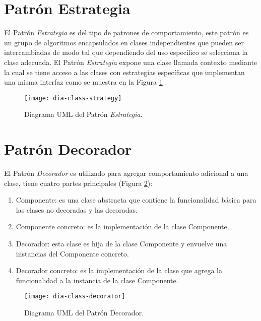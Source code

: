 \section{Patrón Estrategia}\label{sec:strategy}
El Patrón \textit{Estrategia} es del tipo de patrones de comportamiento, este patrón es un grupo de algoritmos encapsulados en clases independientes que pueden ser intercambiadas de modo tal que dependiendo del uso específico se selecciona la clase adecuada. El Patrón \textit{Estrategia} expone una clase llamada contexto mediante la cual se tiene acceso a las clases con estrategias específicas que implementan una misma interfaz como se muestra en la Figura \ref{fig:dia-class-strategy} \cite{DesignPatternsLasater, DesignPatterns}.

\begin{figure}[h]
  \centering
  \texttt{[image: dia-class-strategy]}
  \caption{Diagrama UML del Patrón \textit{Estrategia}\cite{DesignPatternsLasater}.}
  \label{fig:dia-class-strategy}
\end{figure}

\section{Patrón Decorador}\label{sec:decorator}
El Patrón \textit{Decorador} es utilizado para agregar comportamiento adicional a una clase, tiene cuatro partes principales\cite{DesignPatternsLasater} (Figura \ref{fig:dia-class-decorator}):
\begin{enumerate}
  \item Componente: es una clase abstracta que contiene la funcionalidad básica para las clases no decoradas y las decoradas.
  \item Componente concreto: es la implementación de la clase Componente.
  \item Decorador: esta clase es hija de la clase Componente y envuelve una instancias del Componente concreto.
  \item Decorador concreto: es la implementación de la clase que agrega la funcionalidad a la instancia de la clase Componente.
\end{enumerate}

\begin{figure}[h]
  \centering
  \texttt{[image: dia-class-decorator]}
  \caption{Diagrama UML del Patrón Decorador\cite{DesignPatternsLasater}.}
  \label{fig:dia-class-decorator}
\end{figure}

